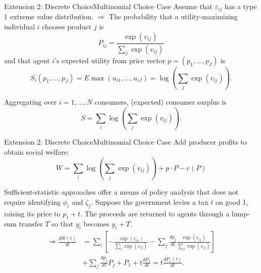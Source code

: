 \documentclass{beamer}
\begin{document}
\begin{frame}{Extension 2: Discrete Choice}{Multinomial Choice Case}
	Assume that $\varepsilon_{ij}$ has a type 1 extreme value distribution. $\Rightarrow$ The probability that a utility-maximizing individual $i$ chooses product $j$ is
	\begin{equation}
		P_{ij} = \frac{\exp(v_{ij})}{\sum_j \exp(v_{ij})}
	\end{equation}
	and that agent $i$'s expected utility from price vector $p=(p_1,...,p_J)$ is
	\begin{equation}
		S_i(p_1,...,p_J) = E\max(u_{i1},...,u_{iJ}) = \log \left(\sum_j\exp(v_{ij})\right).
	\end{equation}

	Aggregating over $i=1,...,N$ consumers, (expected) consumer surplus is
	\begin{equation}
		S = \sum_i\log\left(\sum_j\exp(v_{ij}) \right).
	\end{equation}
\end{frame}
\begin{frame}{Extension 2: Discrete Choice}{Multinomial Choice Case}
	Add producer profits to obtain social welfare:
	\begin{equation}
		W = \sum_i\log\left(\sum_j\exp(v_{ij})\right) + p\cdot P-c(P)
	\end{equation}

	Sufficient-statistic approaches offer a means of policy analysis that does not require identifying $\phi_i$ and $\zeta_j$. Suppose the government levies a tax $t$ on good 1, raising its price to $p_1+t$. The proceeds are returned to agents through a lump-sum transfer $T$ so that $y_i$ becomes $y_i+T$.
	\begin{equation}
		\begin{aligned}
			\Rightarrow \frac{dW(t)}{dt} &= \sum_i\left[-\frac{\exp(v_{i1})}{\sum_j \exp(v_{ij})} - \sum_j\frac{dp_j}{dt}\frac{\exp(v_{ij})}{\sum_j \exp(v_{ij})} \right] \\
			&+ \sum_j\frac{dp_j}{dt}P_j + P_1 + t\frac{dP_1}{dt} = t\frac{dP_1(t)}{dt}.
		\end{aligned}
	\end{equation}
\end{frame}
\end{document}
